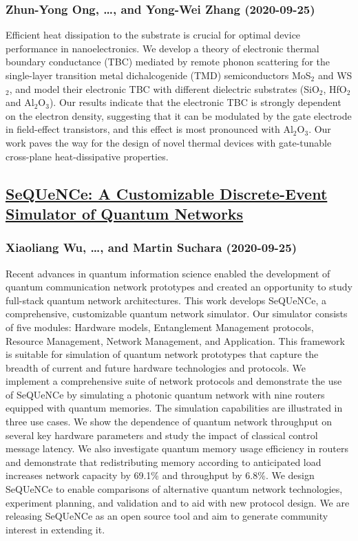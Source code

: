 \subsubsection*{Zhun-Yong Ong, \dots, and Yong-Wei Zhang (2020-09-25)}
Efficient heat dissipation to the substrate is crucial for optimal device
performance in nanoelectronics. We develop a theory of electronic thermal
boundary conductance (TBC) mediated by remote phonon scattering for the
single-layer transition metal dichalcogenide (TMD) semiconductors MoS$_{2}$ and
WS$_{2}$, and model their electronic TBC with different dielectric substrates
(SiO$_{2}$, HfO$_{2}$ and Al$_{2}$O$_{3}$). Our results indicate that the
electronic TBC is strongly dependent on the electron density, suggesting that
it can be modulated by the gate electrode in field-effect transistors, and this
effect is most pronounced with Al$_{2}$O$_{3}$. Our work paves the way for the
design of novel thermal devices with gate-tunable cross-plane heat-dissipative
properties.

\subsection*{\href{http://arxiv.org/abs/2009.12000v1}{SeQUeNCe: A Customizable Discrete-Event Simulator of Quantum Networks}}
\subsubsection*{Xiaoliang Wu, \dots, and Martin Suchara (2020-09-25)}
Recent advances in quantum information science enabled the development of
quantum communication network prototypes and created an opportunity to study
full-stack quantum network architectures. This work develops SeQUeNCe, a
comprehensive, customizable quantum network simulator. Our simulator consists
of five modules: Hardware models, Entanglement Management protocols, Resource
Management, Network Management, and Application. This framework is suitable for
simulation of quantum network prototypes that capture the breadth of current
and future hardware technologies and protocols. We implement a comprehensive
suite of network protocols and demonstrate the use of SeQUeNCe by simulating a
photonic quantum network with nine routers equipped with quantum memories. The
simulation capabilities are illustrated in three use cases. We show the
dependence of quantum network throughput on several key hardware parameters and
study the impact of classical control message latency. We also investigate
quantum memory usage efficiency in routers and demonstrate that redistributing
memory according to anticipated load increases network capacity by 69.1\% and
throughput by 6.8\%. We design SeQUeNCe to enable comparisons of alternative
quantum network technologies, experiment planning, and validation and to aid
with new protocol design. We are releasing SeQUeNCe as an open source tool and
aim to generate community interest in extending it.

